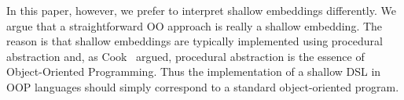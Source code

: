 \begin{comment}
For example, in their work
on EDSLs~\cite{}, Gibbons and Wu claim that deep embeddings (which
encode ASTs using algebraic datatypes in Haskell) allow adding new DSL
interpretations easily, but they make adding new language constructs
difficult. In contrast Gibbons and Wu claim that shallow embeddings
have dual modularity properties: new cases are easy to add, but new
interpretations are hard.  However what if, instead of using Haskell
and algebraic datatypes, one uses an OO language to encode an AST, for
example with the {\sc Composite} pattern.  Would this OO approach be
classified as a shallow or deep embedding? We believe arguments can be
made both ways. Since the {\sc Composite}
pattern is normally accepted to be a way to encode ASTs, it would be
reasonable to say that \emph{according to definition of deep embedding
  above, the OO approach classifies as a deep
  embedding}. Unfortunatelly this interpretation could be problematic.
As the Expression Problem~\cite{} tell us,
in the OO approach adding new language constructs is easy, but adding
interpretations is hard. Thus this would contradict Gibbons and Wu's
claims, since we have an AST representation (i.e. a deep embedding)
with the modularity properties of shallow embeddings.

We believe that the core of problem is that ASTs can be represented in
multiple ways. In particular, it is well know that functions alone are
enough to encode datastructures such as ASTs (via Church
encodings~\cite{}).  Distinguishing deep and shallow embeddings based
solely on whether a ``real'' datastructure is being used or not is
misleading.  Moreover, it gives the impression that shallow embeddings
are significantly less expressive than deep embeddings, because they
do not have access to the datastructure.
Gibbons and Wu themselves feel uneasy with the definition of shallow 
embeddings when they say:
``\emph{So it turns out that the syntax of the DSL is not really as ephemeral
in a shallow embedding as Boulton's choice of terms suggests.}''
\end{comment}

In this paper, however, we prefer to interpret shallow embeddings
differently. We argue that a straightforward OO approach is really a
shallow embedding. The reason is that shallow embeddings are typically
implemented using procedural abstraction and, as Cook~\cite{} argued,
procedural abstraction is the essence of Object-Oriented
Programming. Thus the implementation of a shallow
DSL in OOP languages should simply correspond to a standard
object-oriented program.


